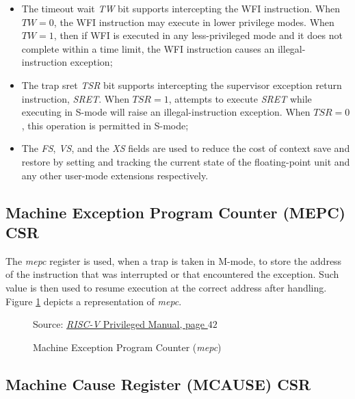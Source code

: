 \begin{itemize}
  \item The timeout wait \textit{TW} bit supports intercepting the WFI
    instruction. When $\textit{TW}=0$, the WFI instruction may execute in lower
    privilege modes. When $\textit{TW}=1$, then if WFI is executed in any less-privileged
    mode and it does not complete within a time limit, the WFI instruction causes
    an illegal-instruction exception;

  \item The trap sret \textit{TSR} bit supports intercepting the supervisor
    exception return instruction, \textit{SRET}. When $\textit{TSR}=1$, attempts
    to execute \textit{SRET} while executing in S-mode will raise an illegal-instruction
    exception. When $\textit{TSR}=0$, this operation is permitted in S-mode;

  \item The \textit{FS}, \textit{VS}, and the \textit{XS} fields are used to
    reduce the cost of context save and restore by setting and tracking the
    current state of the floating-point unit and any other user-mode extensions
    respectively.
\end{itemize}

\subsection{Machine Exception Program Counter (MEPC) CSR}
\label{subsec:mepc}

The \textit{mepc} register is used, when a trap is taken in M-mode, to store the
address of the instruction that was interrupted or that encountered the exception.
Such value is then used to resume execution at the correct address after
handling. Figure \ref{fig:mepc} depicts a representation of \textit{mepc}. \\
\begin{figure}[H]
  \centering
  \def\stackalignment{r} %
  {\scriptsize Source: \href{https://drive.google.com/file/d/17GeetSnT5wW3xNuAHI95-SI1gPGd5sJ_/view}{\textit{RISC-V} Privileged Manual, page $42$}}
  \caption{Machine Exception Program Counter (\textit{mepc})}
  \label{fig:mepc}
\end{figure}

\subsection{Machine Cause Register (MCAUSE) CSR}
\label{subsec:mcause}

